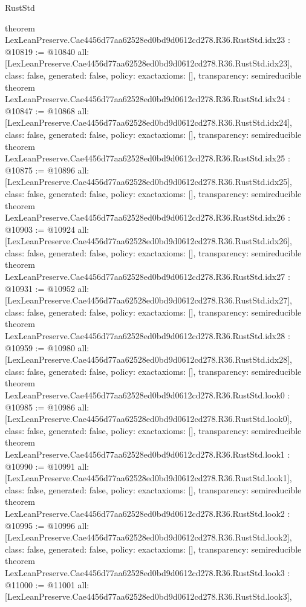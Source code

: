 \begin{lexlean}{RustStd}
\begin{coremodule}
{}
theorem LexLeanPreserve.Cae4456d77aa62528ed0bd9d0612cd278.R36.RustStd.idx23 : @10819 := @10840 {
  all: [LexLeanPreserve.Cae4456d77aa62528ed0bd9d0612cd278.R36.RustStd.idx23],
  class: false,
  generated: false,
  policy: exact{axioms: []},
  transparency: semireducible
}
theorem LexLeanPreserve.Cae4456d77aa62528ed0bd9d0612cd278.R36.RustStd.idx24 : @10847 := @10868 {
  all: [LexLeanPreserve.Cae4456d77aa62528ed0bd9d0612cd278.R36.RustStd.idx24],
  class: false,
  generated: false,
  policy: exact{axioms: []},
  transparency: semireducible
}
theorem LexLeanPreserve.Cae4456d77aa62528ed0bd9d0612cd278.R36.RustStd.idx25 : @10875 := @10896 {
  all: [LexLeanPreserve.Cae4456d77aa62528ed0bd9d0612cd278.R36.RustStd.idx25],
  class: false,
  generated: false,
  policy: exact{axioms: []},
  transparency: semireducible
}
theorem LexLeanPreserve.Cae4456d77aa62528ed0bd9d0612cd278.R36.RustStd.idx26 : @10903 := @10924 {
  all: [LexLeanPreserve.Cae4456d77aa62528ed0bd9d0612cd278.R36.RustStd.idx26],
  class: false,
  generated: false,
  policy: exact{axioms: []},
  transparency: semireducible
}
theorem LexLeanPreserve.Cae4456d77aa62528ed0bd9d0612cd278.R36.RustStd.idx27 : @10931 := @10952 {
  all: [LexLeanPreserve.Cae4456d77aa62528ed0bd9d0612cd278.R36.RustStd.idx27],
  class: false,
  generated: false,
  policy: exact{axioms: []},
  transparency: semireducible
}
theorem LexLeanPreserve.Cae4456d77aa62528ed0bd9d0612cd278.R36.RustStd.idx28 : @10959 := @10980 {
  all: [LexLeanPreserve.Cae4456d77aa62528ed0bd9d0612cd278.R36.RustStd.idx28],
  class: false,
  generated: false,
  policy: exact{axioms: []},
  transparency: semireducible
}
theorem LexLeanPreserve.Cae4456d77aa62528ed0bd9d0612cd278.R36.RustStd.look0 : @10985 := @10986 {
  all: [LexLeanPreserve.Cae4456d77aa62528ed0bd9d0612cd278.R36.RustStd.look0],
  class: false,
  generated: false,
  policy: exact{axioms: []},
  transparency: semireducible
}
theorem LexLeanPreserve.Cae4456d77aa62528ed0bd9d0612cd278.R36.RustStd.look1 : @10990 := @10991 {
  all: [LexLeanPreserve.Cae4456d77aa62528ed0bd9d0612cd278.R36.RustStd.look1],
  class: false,
  generated: false,
  policy: exact{axioms: []},
  transparency: semireducible
}
theorem LexLeanPreserve.Cae4456d77aa62528ed0bd9d0612cd278.R36.RustStd.look2 : @10995 := @10996 {
  all: [LexLeanPreserve.Cae4456d77aa62528ed0bd9d0612cd278.R36.RustStd.look2],
  class: false,
  generated: false,
  policy: exact{axioms: []},
  transparency: semireducible
}
theorem LexLeanPreserve.Cae4456d77aa62528ed0bd9d0612cd278.R36.RustStd.look3 : @11000 := @11001 {
  all: [LexLeanPreserve.Cae4456d77aa62528ed0bd9d0612cd278.R36.RustStd.look3],
}
\end{coremodule}
\end{lexlean}
